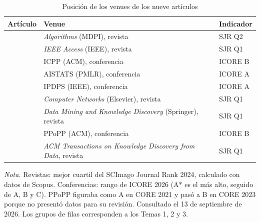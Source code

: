 \begin{table}[H]
\caption{Posición de los venues de los nueve artículos}\label{tab:ranking}
\small
\begin{tabularx}{\textwidth}{@{}L{3.6cm}YL{3.4cm}@{}}
\toprule
\textbf{Artículo} & \textbf{Venue} & \textbf{Indicador} \\
\midrule
\textcite{nigro2022}      & \textit{Algorithms} (MDPI), revista                       & SJR Q2 \\
\textcite{kwedlo2021}     & \textit{IEEE Access} (IEEE), revista                      & SJR Q1 \\
\textcite{kwedlo2024}     & ICPP (ACM), conferencia                                   & ICORE B \\
\addlinespace
\textcite{hess2023}       & AISTATS (PMLR), conferencia                               & ICORE A \\
\textcite{bellavita2026}  & IPDPS (IEEE), conferencia                                 & ICORE A \\
\textcite{xu2021}         & \textit{Computer Networks} (Elsevier), revista            & SJR Q1 \\
\addlinespace
\textcite{li2023}         & \textit{Data Mining and Knowledge Discovery} (Springer), revista & SJR Q1 \\
\textcite{bellavita2025}  & PPoPP (ACM), conferencia                                  & ICORE B \\
\textcite{voevodski2024}  & \textit{ACM Transactions on Knowledge Discovery from Data}, revista & SJR Q1 \\
\bottomrule
\end{tabularx}

{\footnotesize\textit{Nota.} Revistas: mejor cuartil del SCImago Journal Rank 2024, calculado con
datos de Scopus. Conferencias: rango de ICORE 2026 (A* es el más alto, seguido de A, B y C). PPoPP
figuraba como A en CORE 2021 y pasó a B en CORE 2023 porque no presentó datos para su revisión.
Consultado el 13 de septiembre de 2026. Los grupos de filas corresponden a los Temas 1, 2 y 3.\par}
\end{table}
